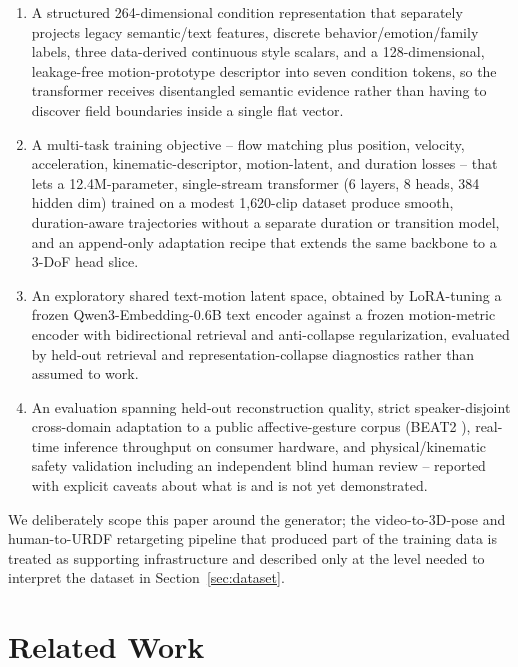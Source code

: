 \documentclass[conference]{IEEEtran}
\begin{document}
\begin{enumerate}
\item A structured 264-dimensional condition representation that
  separately projects legacy semantic/text features, discrete
  behavior/emotion/family labels, three data-derived continuous style
  scalars, and a 128-dimensional, leakage-free motion-prototype
  descriptor into seven condition tokens, so the transformer receives
  disentangled semantic evidence rather than having to discover field
  boundaries inside a single flat vector.
\item A multi-task training objective -- flow matching plus position,
  velocity, acceleration, kinematic-descriptor, motion-latent, and
  duration losses -- that lets a 12.4M-parameter, single-stream
  transformer (6 layers, 8 heads, 384 hidden dim) trained on a modest
  1{,}620-clip dataset produce smooth, duration-aware trajectories
  without a separate duration or transition model, and an append-only
  adaptation recipe that extends the same backbone to a 3-DoF head slice.
\item An exploratory shared text-motion latent space, obtained by
  LoRA-tuning a frozen Qwen3-Embedding-0.6B text encoder against a
  frozen motion-metric encoder with bidirectional retrieval and
  anti-collapse regularization, evaluated by held-out retrieval and
  representation-collapse diagnostics rather than assumed to work.
\item An evaluation spanning held-out reconstruction quality, strict
  speaker-disjoint cross-domain adaptation to a public affective-gesture
  corpus (BEAT2 \cite{beat2}), real-time inference throughput on
  consumer hardware, and physical/kinematic safety validation including
  an independent blind human review -- reported with explicit caveats
  about what is and is not yet demonstrated.
\end{enumerate}

We deliberately scope this paper around the generator; the
video-to-3D-pose and human-to-URDF retargeting pipeline that produced
part of the training data is treated as supporting infrastructure and
described only at the level needed to interpret the dataset in
Section~\ref{sec:dataset}.

\section{Related Work}
\label{sec:related}
\end{document}
